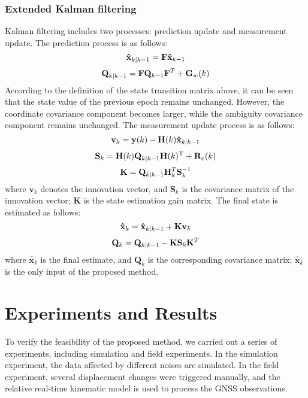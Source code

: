 \documentclass{svjour3}                     %
\begin{document}
\subsubsection{Extended Kalman filtering}
Kalman filtering includes two processes: prediction update and measurement update\citep{grewal2001kalman}. The prediction process is as follows:
\begin{equation}
{{\bf{\hat x}}_{k|k - 1}} = {\bf{F}}{{\bf{\hat x}}_{k - 1}}
\end{equation}
\begin{equation}
{{\bf{Q}}_{k|k - 1}} = {\bf{F}}{{\bf{Q}}_{k - 1}}{{\bf{F}}^T} + {{\bf{G}}_w}(k)
\end{equation}
According to the definition of the state transition matrix above, it can be seen that the state value of the previous epoch remains unchanged. However, the coordinate covariance component becomes larger, while the ambiguity covariance component remains unchanged. The measurement update process is as follows:
\begin{equation}
{{\bf{v}}_k} = {\bf{y}}(k) - {\bf{H}}(k){{\bf{\hat x}}_{k|k - 1}}
\end{equation}
\begin{equation}
{{\bf{S}}_k} = {\bf{H}}(k){{\bf{Q}}_{k|k - 1}}{\bf{H}}{(k)^{\rm{T}}} + {{\bf{R}}_\varepsilon }(k)
\end{equation}
\begin{equation}
{\bf{K}} = {{\bf{Q}}_{k|k - 1}}{\bf{H}}_k^T{\bf{S}}_k^{ - 1}
\end{equation}
where ${{\mathbf{v}}_{k}}$ denotes the innovation vector, and ${{\mathbf{S}}_{k}}$ is the covariance matrix of the innovation vector; $\mathbf{K}$ is the state estimation gain matrix. The final state is estimated as follows:
\begin{equation}
{{\bf{\hat x}}_k} = {{\bf{\hat x}}_{k|k - 1}} + {\bf{K}}{{\bf{v}}_k}
\end{equation}
\begin{equation}
{{\bf{Q}}_k} = {{\bf{Q}}_{k|k - 1}} - {\bf{K}}{{\bf{S}}_k}{{\bf{K}}^T}
\end{equation}
where ${{\mathbf{\hat{x}}}_{k}}$ is the final estimate, and ${{\mathbf{Q}}_{k}}$ is the corresponding covariance matrix; ${{\mathbf{\hat{x}}}_{k}}$ is the only input of the proposed method.  

\section{Experiments and Results}
To verify the feasibility of the proposed method, we carried out a series of experiments, including simulation and field experiments. In the simulation experiment, the data affected by different noises are simulated. In the field experiment, several displacement changes were triggered manually, and the relative real-time kinematic model is used to process the GNSS observations.
\end{document}
